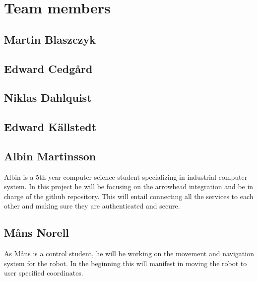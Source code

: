 \section{Team members}

\subsection{Martin Blaszczyk}

\subsection{Edward Cedgård}

\subsection{Niklas Dahlquist}

\subsection{Edward Källstedt}

\subsection{Albin Martinsson}
Albin is a 5th year computer science student specializing in industrial computer system. In this project he will be focusing on the 
arrowhead integration and be in charge of the github repository. This will entail connecting all the services to each other and
making sure they are authenticated and secure. 

\subsection{Måns Norell}
As Måns is a control student, he will be working on the movement and navigation system for the robot. In the beginning this will manifest in moving the robot to user specified coordinates.









